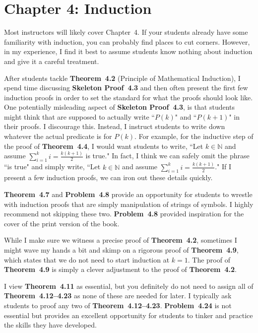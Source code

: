 \documentclass[11pt]{article}%
\newcommand{\blankline}{\pagebreak[2]\vspace{.5\baselineskip}}
\begin{document}
\section*{Chapter 4: Induction}

Most instructors will likely cover Chapter~4.  If your students already have some familiarity with induction, you can probably find places to cut corners.  However, in my experience, I find it best to assume students know nothing about induction and give it a careful treatment.  

\blankline

After students tackle \textbf{Theorem~4.2} (Principle of Mathematical Induction), I spend time discussing \textbf{Skeleton Proof~4.3} and then often present the first few induction proofs in order to set the standard for what the proofs should look like. One potentially misleading aspect of \textbf{Skeleton Proof~4.3}, is that students might think that are supposed to actually write ``$P(k)$" and ``$P(k+1)$" in their proofs.  I discourage this.  Instead, I instruct students to write down whatever the actual predicate is for $P(k)$.  For example, for the inductive step of the proof of \textbf{Theorem~4.4}, I would want students to write, ``Let $k\in\mathbb{N}$ and assume $\sum_{i=1}^k i=\frac{k(k+1)}{2}$ is true." In fact, I think we can safely omit the phrase ``is true" and simply write, ``Let $k\in\mathbb{N}$ and assume $\sum_{i=1}^k i=\frac{k(k+1)}{2}$."  If I present a few induction proofs, we can iron out these details quickly.

\blankline

\textbf{Theorem~4.7} and \textbf{Problem~4.8} provide an opportunity for students to wrestle with induction proofs that are simply manipulation of strings of symbols.  I highly recommend not skipping these two. \textbf{Problem~4.8} provided inspiration for the cover of the print version of the book.

\blankline

While I make sure we witness a precise proof of \textbf{Theorem~4.2}, sometimes I might wave my hands a bit and skimp on a rigorous proof of \textbf{Theorem~4.9}, which states that we do not need to start induction at $k=1$.  The proof of \textbf{Theorem~4.9} is simply a clever adjustment to the proof of \textbf{Theorem~4.2}.  

\blankline

I view \textbf{Theorem~4.11} as essential, but you definitely do not need to assign all of \textbf{Theorem~4.12--4.23} as none of these are needed for later.  I typically ask students to proof any two of \textbf{Theorem~4.12--4.23}.  \textbf{Problem~4.24} is not essential but provides an excellent opportunity for students to tinker and practice the skills they have developed.
\end{document}
